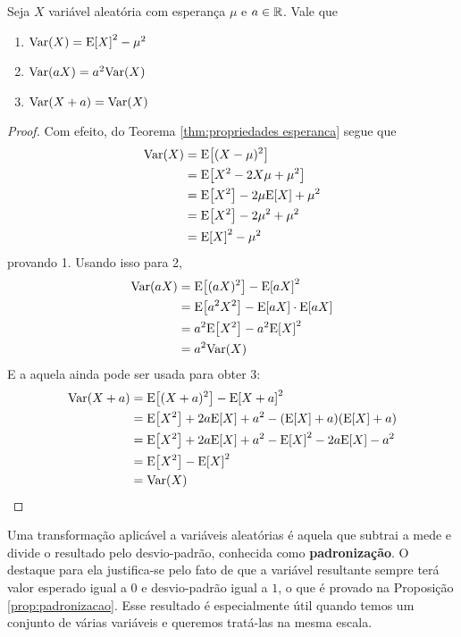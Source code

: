 \begin{thm:propriedades variancia}
\label{prop:propriedades variancia}
Seja $X$ variável aleatória com esperança $\mu$ e $a \in \mathbb{R}$.
Vale que
\begin{enumerate}
	\item $\mathrm{Var}\!\left(X\right) = \mathrm{E}\!\left[X\right]^2 - \mu^2$
	\item $\mathrm{Var}\!\left(aX\right) = a^2 \mathrm{Var}\!\left(X\right)$
	\item $\mathrm{Var}\!\left(X + a\right) = \mathrm{Var}\!\left(X\right)$
\end{enumerate}
\begin{proof}
	Com efeito, do Teorema \ref{thm:propriedades esperanca} segue que
	\begin{align*}
		\mathrm{Var}\!\left(X\right) & = \mathrm{E}\!\left[(X - \mu)^2\right]               \\
		        & = \mathrm{E}\!\left[X^2 - 2X\mu + \mu^2\right]       \\
		        & = \mathrm{E}\!\left[X^2\right] - 2\mu \mathrm{E}\!\left[X\right] + \mu^2 \\
		        & = \mathrm{E}\!\left[X^2\right] - 2 \mu^2 + \mu^2     \\
		        & = \mathrm{E}\!\left[X\right]^2 - \mu^2
	\end{align*}
	provando 1.
	Usando isso para 2,
	\begin{align*}
		\var{aX} & = \ev{(aX)^2} - \ev{aX}^2             \\
		         & = \ev{a^2X^2} - \ev{aX} \cdot \ev{aX} \\
		         & = a^2 \ev{X^2} - a^2 \ev{X}^2         \\
		         & = a^2 \var{X}
	\end{align*}
	E a aquela ainda pode ser usada para obter 3:
	\begin{align*}
		\var{X + a} & = \ev{(X + a)^2} - \ev{X + a}^2                           \\
		            & = \ev{X^2} + 2a \ev{X} + a^2 - (\ev{X} + a)(\ev X + a)    \\
		            & = \ev{X^2} + 2a \ev{X} + a^2 - \ev{X}^2 - 2a \ev{X} - a^2 \\
		            & = \ev{X^2} - \ev{X}^2                                     \\
		            & = \var{X}
	\end{align*}
\end{proof}
\end{thm:propriedades variancia}

Uma transformação aplicável a variáveis aleatórias é aquela que subtrai a mede e divide
o resultado pelo desvio-padrão, conhecida como \textbf{padronização}.
O destaque para ela justifica-se pelo fato de que a variável resultante sempre terá
valor esperado igual a $0$ e desvio-padrão igual a $1$, o que é provado na Proposição
\ref{prop:padronizacao}.
Esse resultado é especialmente útil quando temos um conjunto de várias variáveis e queremos
tratá-las na mesma escala.

